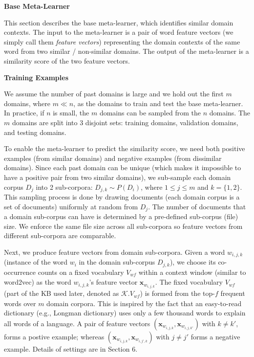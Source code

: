 \textbf{Base Meta-Learner}

This section describes the base meta-learner, which identifies similar domain contexts. The input to the meta-learner is a pair of word feature vectors (we simply call them \emph{feature vectors}) representing the domain contexts of the same word from two similar / non-similar domains.
The output of the meta-learner is a similarity score of the two feature vectors.

\textbf{Training Examples}

We assume the number of past domains is large and we hold out the first $m$ domains, where $m \ll n$, as the domains to train and test the base meta-learner.
In practice, if $n$ is small, the $m$ domains can be sampled from the $n$ domains.
The $m$ domains are split into 3 disjoint sets: training domains, validation domains, and testing domains.

To enable the meta-learner to predict the similarity score, we need both positive examples (from similar domains) and negative examples (from dissimilar domains).
Since each past domain can be unique (which makes it impossible to have a positive pair from two similar domains), we sub-sample each domain corpus $D_j$ into 2 sub-corpora: $D_{j, k} \sim P(D_i)$, where $1\le j\le m$ and $k=\{1, 2\}$.
This sampling process is done by drawing documents (each domain corpus is a set of documents) uniformly at random from $D_j$.
The number of documents that a domain sub-corpus can have is determined by a pre-defined sub-corpus (file) size.
We enforce the same file size across all sub-corpora so feature vectors from different sub-corpora are comparable.

Next, we produce feature vectors from domain sub-corpora.
Given a word $w_{i, j, k}$ (instance of the word $w_{i}$ in the domain sub-corpus $D_{j, k}$), we choose its co-occurrence counts on a fixed vocabulary $V_{\textit{wf}}$ within a context window (similar to word2vec) as the word $w_{i, j, k}$'s feature vector $\mathbf{x}_{w_{i, j, k}}$.
The fixed vocabulary $V_{\textit{wf}}$ (part of the KB used later, denoted as $\mathcal{K}.V_{\textit{wf}}$) is formed from the top-$f$ frequent words over $m$ domain corpora.
This is inspired by the fact that an easy-to-read dictionary (e.g., Longman dictionary) uses only a few thousand words to explain all words of a language.
A pair of feature vectors $(\mathbf{x}_{w_{i, j, k}}, \mathbf{x}_{w_{i, j, k'}})$ with $k \neq k'$, forms a postive example; 
whereas $(\mathbf{x}_{w_{i, j, k}}, \mathbf{x}_{w_{i, j', k}})$ with $j\neq j'$ forms a negative example.
Details of settings are in Section 6.


